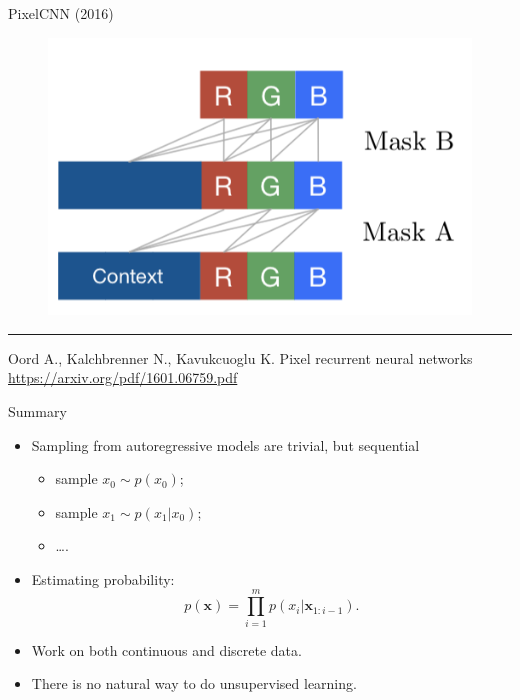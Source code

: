 \documentclass{beamer}
\newcommand{\bx}{\mathbf{x}}
\begin{document}
\begin{frame}{PixelCNN (2016)}
\begin{minipage}[t]{0.5\columnwidth}
\begin{figure}[h]
	\end{figure}
	\vspace{-0.4cm}
	\begin{figure}
		\centering
        \includegraphics[width=0.65\linewidth]{figs/pixelcnn2.png}
	\end{figure}
\end{minipage}
\vfill
\hrule\medskip
{\scriptsize Oord A., Kalchbrenner N., Kavukcuoglu K. Pixel recurrent neural networks \href{https://arxiv.org/pdf/1601.06759.pdf}{https://arxiv.org/pdf/1601.06759.pdf}}
\end{frame}
\begin{frame}{Summary}
    \begin{itemize}
        \item Sampling from autoregressive models are trivial, but sequential
        \begin{itemize}
            \item sample $x_0 \sim p(x_0)$;
            \item sample $x_1 \sim p(x_1 | x_0)$;
            \item \dots.
        \end{itemize}
        \item Estimating probability:
        \[
            p(\bx) = \prod_{i=1}^m p(x_i | \bx_{1:i - 1}).
        \]
        \item Work on both continuous and discrete data.
        \item There is no natural way to do unsupervised learning.
    \end{itemize}
\end{frame}
\end{document}
